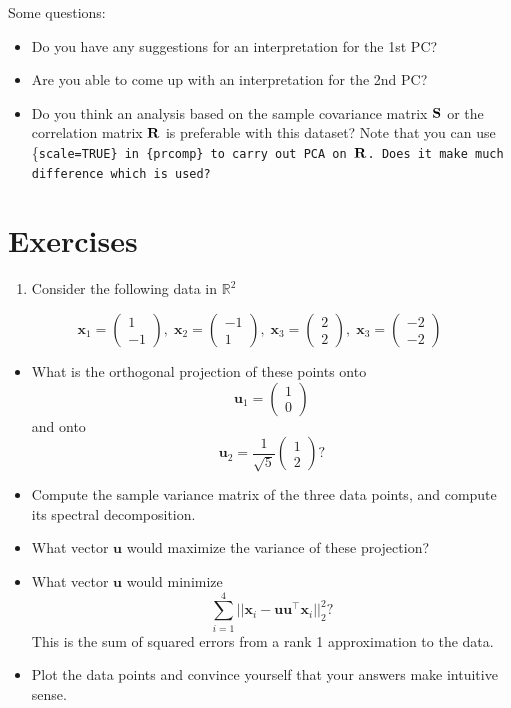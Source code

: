 \documentclass[]{book}
\providecommand{\tightlist}{%
  \setlength{\itemsep}{0pt}\setlength{\parskip}{0pt}}
\theoremstyle{definition}
\theoremstyle{definition}
\theoremstyle{definition}
\theoremstyle{remark}
\begin{document}
Some questions:

\begin{itemize}
\item
  Do you have any suggestions for an interpretation for the 1st PC?
\item
  Are you able to come up with an interpretation for the 2nd PC?
\item
  Do you think an analysis based on the sample covariance matrix \({\bf S}\) or the
  correlation matrix \({\bf R}\) is preferable with this dataset? Note that you can use \{\tt scale=TRUE\} in \{\tt prcomp\}
  to carry out PCA on \({\bf R}\). Does it make much difference which is used?
\end{itemize}

\hypertarget{exercises-1}{%
\section{Exercises}\label{exercises-1}}

\begin{enumerate}
\def\labelenumi{\arabic{enumi}.}
\tightlist
\item
  Consider the following data in \(\mathbb{R}^2\)
\end{enumerate}

\[\mathbf x_1 =\begin{pmatrix}1\\-1\end{pmatrix},\; \mathbf x_2 =\begin{pmatrix}-1\\1\end{pmatrix},
\;\mathbf x_3 =\begin{pmatrix}2\\2\end{pmatrix},\;\mathbf x_3 =\begin{pmatrix}-2\\-2\end{pmatrix}\]

\begin{itemize}
\item
  What is the orthogonal projection of these points onto \[\mathbf u_1 = \begin{pmatrix}1\\0\end{pmatrix}\] and onto \[\mathbf u_2 =\frac{1}{\sqrt{5}}\begin{pmatrix}1\\2\end{pmatrix}?\]
\item
  Compute the sample variance matrix of the three data points, and compute its spectral decomposition.
\item
  What vector \(\mathbf u\) would maximize the variance of these projection?
\item
  What vector \(\mathbf u\) would minimize
  \[\sum_{i=1}^4 ||\mathbf x_i -\mathbf u\mathbf u^\top \mathbf x_i||^2_2?\]
  This is the sum of squared errors from a rank 1 approximation to the data.
\item
  Plot the data points and convince yourself that your answers make intuitive sense.
\end{itemize}
\end{document}
